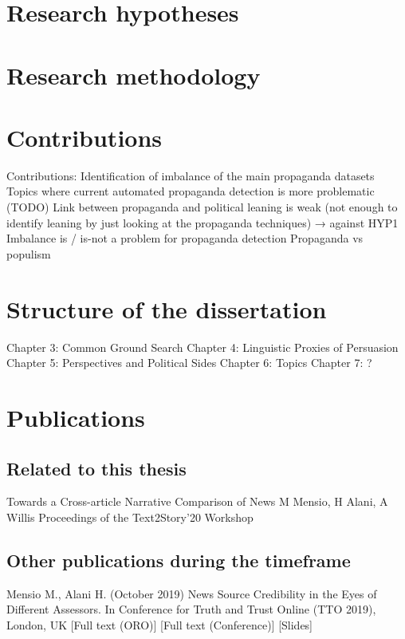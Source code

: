 \section{Research hypotheses}

\section{Research methodology}


\section{Contributions}

Contributions:
Identification of imbalance of the main propaganda datasets
Topics where current automated propaganda detection is more problematic (TODO) 
Link between propaganda and political leaning is weak (not enough to identify leaning by just looking at the propaganda techniques) → against HYP1
Imbalance is / is-not a problem for propaganda detection
Propaganda vs populism

\section{Structure of the dissertation}

Chapter 3: Common Ground Search
Chapter 4: Linguistic Proxies of Persuasion
Chapter 5: Perspectives and Political Sides
Chapter 6: Topics
Chapter 7: ?

\section{Publications}

\subsection{Related to this thesis}

Towards a Cross-article Narrative Comparison of News
M Mensio, H Alani, A Willis
Proceedings of the Text2Story’20 Workshop

\subsection{Other publications during the timeframe}

Mensio M., Alani H. (October 2019) News Source Credibility in the Eyes of Different Assessors. In Conference for Truth and Trust Online (TTO 2019), London, UK [Full text (ORO)] [Full text (Conference)] [Slides]


